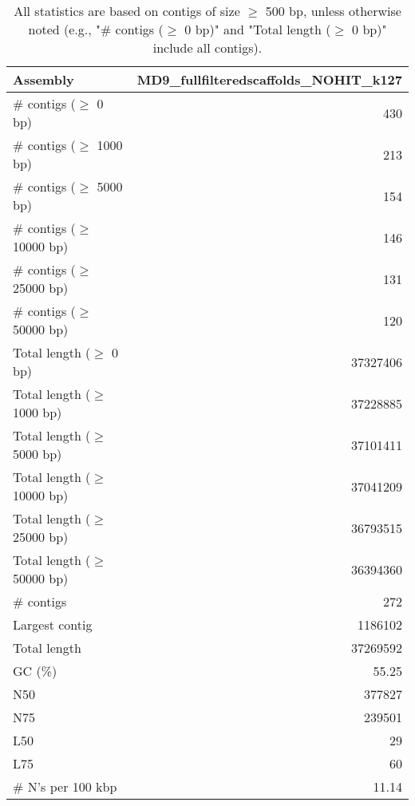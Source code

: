 \documentclass[12pt,a4paper]{article}
\begin{document}
\begin{table}[ht]
\begin{center}
\caption{All statistics are based on contigs of size $\geq$ 500 bp, unless otherwise noted (e.g., "\# contigs ($\geq$ 0 bp)" and "Total length ($\geq$ 0 bp)" include all contigs).}
\begin{tabular}{|l*{1}{|r}|}
\hline
Assembly & MD9\_fullfilteredscaffolds\_NOHIT\_k127 \\ \hline
\# contigs ($\geq$ 0 bp) & 430 \\ \hline
\# contigs ($\geq$ 1000 bp) & 213 \\ \hline
\# contigs ($\geq$ 5000 bp) & 154 \\ \hline
\# contigs ($\geq$ 10000 bp) & 146 \\ \hline
\# contigs ($\geq$ 25000 bp) & 131 \\ \hline
\# contigs ($\geq$ 50000 bp) & 120 \\ \hline
Total length ($\geq$ 0 bp) & 37327406 \\ \hline
Total length ($\geq$ 1000 bp) & 37228885 \\ \hline
Total length ($\geq$ 5000 bp) & 37101411 \\ \hline
Total length ($\geq$ 10000 bp) & 37041209 \\ \hline
Total length ($\geq$ 25000 bp) & 36793515 \\ \hline
Total length ($\geq$ 50000 bp) & 36394360 \\ \hline
\# contigs & 272 \\ \hline
Largest contig & 1186102 \\ \hline
Total length & 37269592 \\ \hline
GC (\%) & 55.25 \\ \hline
N50 & 377827 \\ \hline
N75 & 239501 \\ \hline
L50 & 29 \\ \hline
L75 & 60 \\ \hline
\# N's per 100 kbp & 11.14 \\ \hline
\end{tabular}
\end{center}
\end{table}
\end{document}
